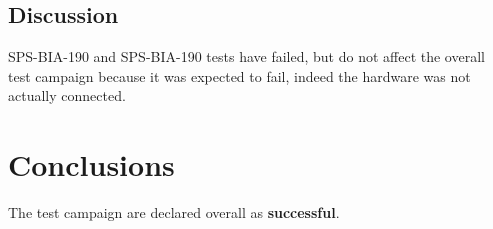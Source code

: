 \subsection{Discussion}
SPS-BIA-190  and SPS-BIA-190 tests have failed, but do not affect the overall test campaign because it was expected to fail,
indeed the hardware was not actually connected.


\section{Conclusions}

The test campaign are declared overall as {\bf successful}.